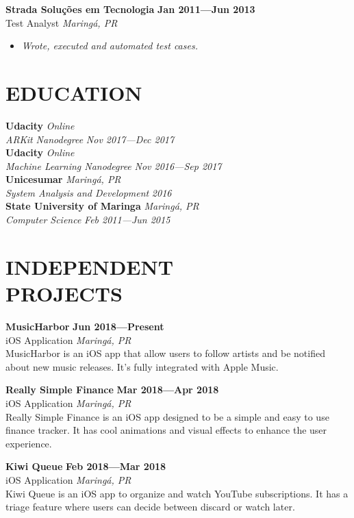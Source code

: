 \documentclass[line,margin]{res}
\begin{document}
\begin{resume}
  {\bf Strada Solu\c{c}\~oes em Tecnologia} \hfill {\bf Jan 2011---Jun 2013} \\
  Test Analyst \hfill {\sl Maring\'a, PR}\\[-6pt]
    \begin{itemize}
    \item {\sl Wrote, executed and automated test cases.}
  \end{itemize}


\section{EDUCATION}
  {\bf Udacity} \hfill {\sl Online} \\
  {\sl ARKit Nanodegree} \hfill {\sl Nov 2017---Dec 2017}\\[6pt]
  {\bf Udacity} \hfill {\sl Online} \\
  {\sl Machine Learning Nanodegree} \hfill {\sl Nov 2016---Sep 2017}\\[6pt]
  {\bf Unicesumar} \hfill {\sl Maring\'a, PR} \\
  {\sl System Analysis and Development} \hfill {\sl 2016}\\[6pt]
  {\bf State University of Maringa} \hfill {\sl Maring\'a, PR} \\
  {\sl Computer Science} \hfill {\sl Feb 2011---Jun 2015}


\section{INDEPENDENT \\ PROJECTS}
  {\bf MusicHarbor} \hfill {\bf Jun 2018---Present} \\
  iOS Application \hfill {\sl Maring\'a, PR}\\[6pt]
  MusicHarbor is an iOS app that allow users to follow artists and be notified about new music releases.
  It's fully integrated with Apple Music.
  
  {\bf Really Simple Finance} \hfill {\bf Mar 2018---Apr 2018} \\
  iOS Application \hfill {\sl Maring\'a, PR}\\[6pt]
  Really Simple Finance is an iOS app designed to be a simple and easy to use finance tracker.
  It has cool animations and visual effects to enhance the user experience.

  {\bf Kiwi Queue} \hfill {\bf Feb 2018---Mar 2018} \\
  iOS Application \hfill {\sl Maring\'a, PR}\\[6pt]
  Kiwi Queue is an iOS app to organize and watch YouTube subscriptions.
  It has a triage feature where users can decide between discard or watch later.



\end{resume}
\end{document}
